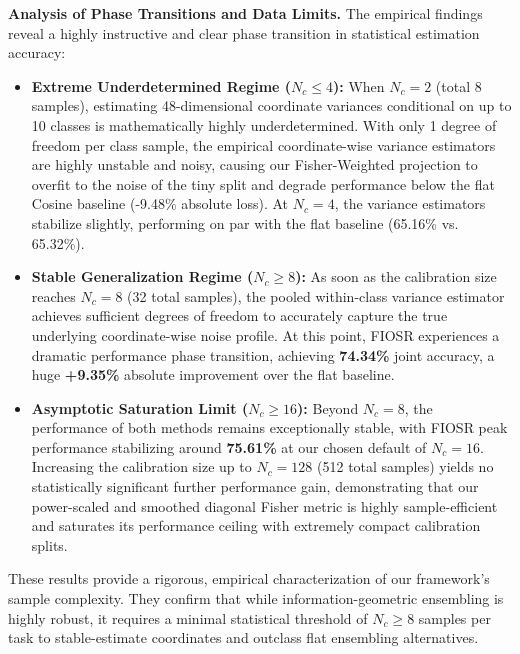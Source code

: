 \textbf{Analysis of Phase Transitions and Data Limits.}
The empirical findings reveal a highly instructive and clear phase transition in statistical estimation accuracy:
\begin{itemize}\setlength{\itemsep}{0.5pt}\setlength{\parskip}{0pt}
    \item \textbf{Extreme Underdetermined Regime ($N_c \le 4$):} When $N_c = 2$ (total 8 samples), estimating 48-dimensional coordinate variances conditional on up to 10 classes is mathematically highly underdetermined. With only 1 degree of freedom per class sample, the empirical coordinate-wise variance estimators are highly unstable and noisy, causing our Fisher-Weighted projection to overfit to the noise of the tiny split and degrade performance below the flat Cosine baseline (-9.48\% absolute loss). At $N_c = 4$, the variance estimators stabilize slightly, performing on par with the flat baseline (65.16\% vs. 65.32\%).
    \item \textbf{Stable Generalization Regime ($N_c \ge 8$):} As soon as the calibration size reaches $N_c = 8$ (32 total samples), the pooled within-class variance estimator achieves sufficient degrees of freedom to accurately capture the true underlying coordinate-wise noise profile. At this point, FIOSR experiences a dramatic performance phase transition, achieving \textbf{74.34\%} joint accuracy, a huge \textbf{+9.35\%} absolute improvement over the flat baseline.
    \item \textbf{Asymptotic Saturation Limit ($N_c \ge 16$):} Beyond $N_c = 8$, the performance of both methods remains exceptionally stable, with FIOSR peak performance stabilizing around \textbf{75.61\%} at our chosen default of $N_c = 16$. Increasing the calibration size up to $N_c = 128$ (512 total samples) yields no statistically significant further performance gain, demonstrating that our power-scaled and smoothed diagonal Fisher metric is highly sample-efficient and saturates its performance ceiling with extremely compact calibration splits.
\end{itemize}
These results provide a rigorous, empirical characterization of our framework's sample complexity. They confirm that while information-geometric ensembling is highly robust, it requires a minimal statistical threshold of $N_c \ge 8$ samples per task to stable-estimate coordinates and outclass flat ensembling alternatives.
